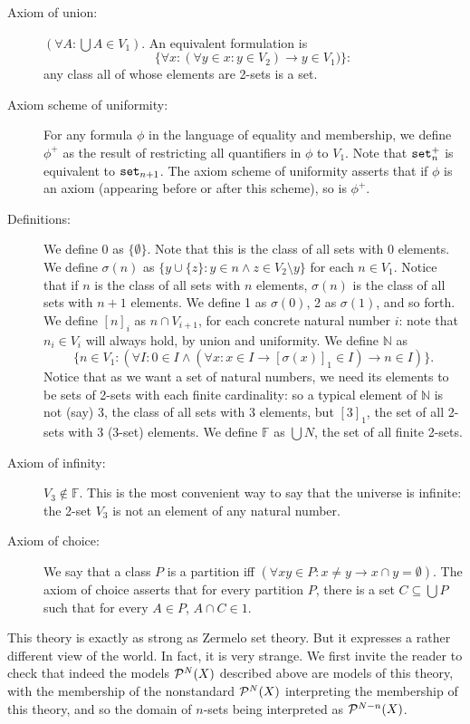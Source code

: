\documentclass[12pt]{article}
\begin{document}
\begin{description}
\item[Axiom of union:]  $(\forall A:\bigcup A \in V_1)$.  An equivalent formulation is $$\{\forall x:(\forall y \in x:y \in V_2)\rightarrow y \in V_1)\}:$$  any class all of whose elements are 2-sets is a set.

\item[Axiom scheme of uniformity:]  For any formula $\phi$ in the language of equality and membership, we define $\phi^+$ as the result of restricting all quantifiers in $\phi$ to $V_1$.  Note that
${\tt set}_n^+$ is equivalent to ${\tt set}_{n+1}$.  The axiom scheme of uniformity asserts that if $\phi$ is an axiom (appearing before or after this scheme), so is $\phi^+$.

\item[Definitions:]  We define 0 as $\{\emptyset\}$.  Note that this is the class of all sets with 0 elements.  We define $\sigma(n)$ as $\{y \cup \{z\}:y \in n \wedge z \in V_2 \setminus y\}$ for each $n \in V_1$.  Notice that if $n$ is the class of all sets with $n$ elements, $\sigma(n)$ is the class of all sets with $n+1$ elements.  We define 1 as $\sigma(0)$, 2 as $\sigma(1)$, and so forth.  We define $[n]_i$ as $n \cap V_{i+1}$, for each concrete natural number $i$:  note that $n_i \in V_i$ will always hold, by union and uniformity.  We define $\mathbb N$ as $$\{n \in V_1:(\forall I:0 \in I \wedge (\forall  x:x \in I \rightarrow [\sigma(x)]_1 \in I) \rightarrow n \in I)\}.$$  Notice that as we want a set of natural numbers, we need its elements to be sets of 2-sets with each finite cardinality:  so a typical element of $\mathbb N$ is not
(say) 3, the class of all sets with 3 elements, but $[3]_1$, the set of all 2-sets with 3 (3-set) elements.  We define $\mathbb F$ as $\bigcup N$, the set of all finite 2-sets.

\item[Axiom of infinity:]  $V_3 \not\in \mathbb F$.  This is the most convenient way to say that the universe is infinite:  the 2-set $V_3$ is not an element of any natural number.

\item[Axiom of choice:]  We say that a class $P$ is a partition iff $(\forall xy \in P:x \neq y \rightarrow x \cap y = \emptyset)$.  The axiom of choice asserts
that for every partition $P$, there is a set $C \subseteq \bigcup P$ such that for every $A \in P$, $A \cap C \in 1$.

\end{description}

This theory is exactly as strong as Zermelo set theory.  But it expresses a rather different view of the world.  In fact, it is very strange.  We first invite the reader to check that
indeed the models ${\cal P}^N(X)$ described above are models of this theory, with the membership of the nonstandard ${\cal P}^N(X)$ interpreting the membership of this theory,
and so the domain of $n$-sets being interpreted as ${\cal P}^{N-n}(X)$.
\end{document}
